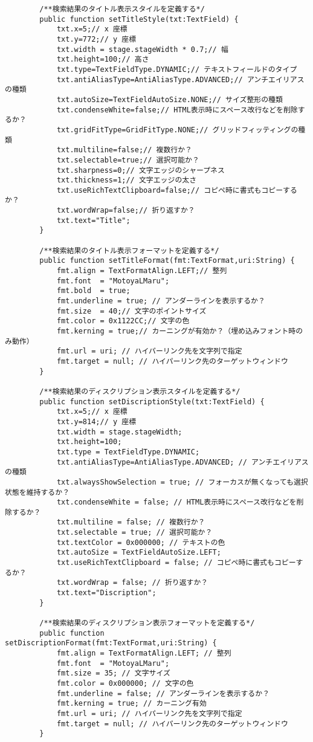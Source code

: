 {\begin{verbatim}
		/**検索結果のタイトル表示スタイルを定義する*/
		public function setTitleStyle(txt:TextField) {
			txt.x=5;// x 座標
			txt.y=772;// y 座標
			txt.width = stage.stageWidth * 0.7;// 幅
			txt.height=100;// 高さ
			txt.type=TextFieldType.DYNAMIC;// テキストフィールドのタイプ
			txt.antiAliasType=AntiAliasType.ADVANCED;// アンチエイリアスの種類
			txt.autoSize=TextFieldAutoSize.NONE;// サイズ整形の種類
			txt.condenseWhite=false;// HTML表示時にスペース改行などを削除するか？
			txt.gridFitType=GridFitType.NONE;// グリッドフィッティングの種類
			txt.multiline=false;// 複数行か？
			txt.selectable=true;// 選択可能か？
			txt.sharpness=0;// 文字エッジのシャープネス
			txt.thickness=1;// 文字エッジの太さ
			txt.useRichTextClipboard=false;// コピペ時に書式もコピーするか？
			txt.wordWrap=false;// 折り返すか？
			txt.text="Title";
		}
		
		/**検索結果のタイトル表示フォーマットを定義する*/
		public function setTitleFormat(fmt:TextFormat,uri:String) {
			fmt.align = TextFormatAlign.LEFT;// 整列
			fmt.font  = "MotoyaLMaru";
			fmt.bold  = true;
			fmt.underline = true; // アンダーラインを表示するか？
			fmt.size  = 40;// 文字のポイントサイズ
			fmt.color = 0x1122CC;// 文字の色
			fmt.kerning = true;// カーニングが有効か？（埋め込みフォント時のみ動作）
			fmt.url = uri; // ハイパーリンク先を文字列で指定
			fmt.target = null; // ハイパーリンク先のターゲットウィンドウ
		}
		
		/**検索結果のディスクリプション表示スタイルを定義する*/
		public function setDiscriptionStyle(txt:TextField) {
			txt.x=5;// x 座標
			txt.y=814;// y 座標
			txt.width = stage.stageWidth;
			txt.height=100;
			txt.type = TextFieldType.DYNAMIC;
			txt.antiAliasType=AntiAliasType.ADVANCED; // アンチエイリアスの種類
			txt.alwaysShowSelection = true; // フォーカスが無くなっても選択状態を維持するか？ 
			txt.condenseWhite = false; // HTML表示時にスペース改行などを削除するか？
			txt.multiline = false; // 複数行か？
			txt.selectable = true; // 選択可能か？
			txt.textColor = 0x000000; // テキストの色
			txt.autoSize = TextFieldAutoSize.LEFT;
			txt.useRichTextClipboard = false; // コピペ時に書式もコピーするか？
			txt.wordWrap = false; // 折り返すか？
			txt.text="Discription";
		}
		
		/**検索結果のディスクリプション表示フォーマットを定義する*/
		public function setDiscriptionFormat(fmt:TextFormat,uri:String) {
			fmt.align = TextFormatAlign.LEFT; // 整列
			fmt.font  = "MotoyaLMaru";
			fmt.size = 35; // 文字サイズ
			fmt.color = 0x000000; // 文字の色
			fmt.underline = false; // アンダーラインを表示するか？
			fmt.kerning = true; // カーニング有効
			fmt.url = uri; // ハイパーリンク先を文字列で指定
			fmt.target = null; // ハイパーリンク先のターゲットウィンドウ
		}
		

\end{verbatim}}
